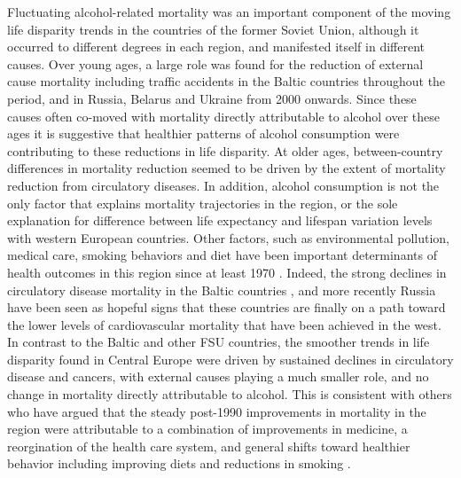\documentclass{article}
\begin{document}
\begin{spacing}{1.5}
Fluctuating alcohol-related mortality was an important component of the moving life disparity trends in the \textcolor[rgb]{1,0,0}{countries of the former Soviet Union, although it occurred to different degrees in each region, and manifested itself in different causes. Over young ages, a large role was found for the reduction of external cause mortality including traffic accidents in the Baltic countries throughout the period, and in Russia, Belarus and Ukraine from 2000 onwards. \textcolor[rgb]{0,0.58,0}{Since these causes often co-moved with mortality directly attributable to alcohol over these ages it is suggestive that healthier patterns of alcohol consumption were contributing to these reductions in life disparity.} At older ages, between-country differences in mortality reduction seemed to be driven by the extent of mortality reduction from circulatory diseases. In addition, alcohol consumption is not the only factor that explains mortality trajectories in the region, or \textcolor[rgb]{0,0.58,0}{the sole explanation for} difference between life expectancy and lifespan variation levels with western European countries. Other factors, such as environmental pollution, medical care, smoking behaviors and diet \textcolor[rgb]{0,0.58,0}{have been} important determinants of health outcomes in this region since at least 1970 \citep{bobak1996east}}. \textcolor[rgb]{0,0.58,0}{Indeed, the strong declines in circulatory disease mortality in the Baltic countries \citep{jasilionis2011}, and more recently Russia \citep{grigoriev2014recent} have been seen as hopeful signs that these countries are finally on a path toward the lower levels of cardiovascular mortality that have been achieved in the west.} \\

\textcolor[rgb]{1,0,0}{In contrast to the Baltic and other FSU countries, the smoother trends in life disparity found in Central Europe were driven by \textcolor[rgb]{0,0.58,0}{sustained declines in circulatory disease and cancers, with external causes playing a much smaller role, and no change in mortality directly attributable to alcohol}. This is consistent with others who have argued that the steady post-1990 improvements in mortality in the region were attributable to a combination of improvements in medicine, a reorgination of the health care system, and general shifts toward healthier behavior including improving diets and reductions in smoking \citep{pajkak2011cardiovascular, zatonski1998ecological, Fihel2017, cifkova2010, rychtarikova2004}.}\\ 


\end{spacing}
\end{document}
